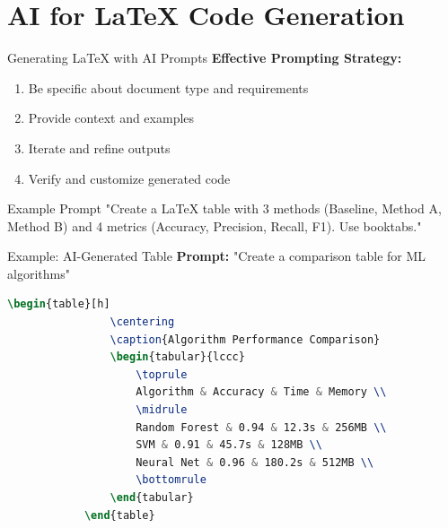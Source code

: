 \documentclass[aspectratio=169]{beamer}
\begin{document}
	\section{AI for LaTeX Code Generation}
	
	\begin{frame}{Generating LaTeX with AI Prompts}
		\textbf{Effective Prompting Strategy:}
		\begin{enumerate}
			\item Be specific about document type and requirements
			\item Provide context and examples
			\item Iterate and refine outputs
			\item Verify and customize generated code
		\end{enumerate}
		
		\vspace{0.8em}
		
		\begin{exampleblock}{Example Prompt}
			\small
			"Create a LaTeX table with 3 methods (Baseline, Method A, Method B) and 4 metrics (Accuracy, Precision, Recall, F1). Use booktabs."
		\end{exampleblock}
	\end{frame}
	
	\begin{frame}[fragile]{Example: AI-Generated Table}
		\textbf{Prompt:} "Create a comparison table for ML algorithms"
		
		\vspace{0.3em}
		
		\begin{lstlisting}[language=TeX,basicstyle=\ttfamily\footnotesize]
			\begin{table}[h]
				\centering
				\caption{Algorithm Performance Comparison}
				\begin{tabular}{lccc}
					\toprule
					Algorithm & Accuracy & Time & Memory \\
					\midrule
					Random Forest & 0.94 & 12.3s & 256MB \\
					SVM & 0.91 & 45.7s & 128MB \\
					Neural Net & 0.96 & 180.2s & 512MB \\
					\bottomrule
				\end{tabular}
			\end{table}
		\end{lstlisting}
	\end{frame}
	
\end{document}
